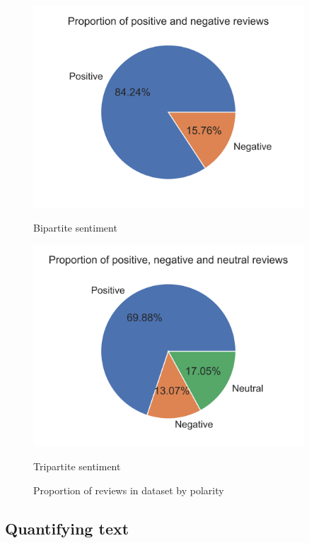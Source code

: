 \documentclass[11pt, a4paper]{pancake-article}
\begin{document}
\begin{figure}[htpb]
  \centering
  \begin{minipage}{0.5\textwidth}
    \centering
    \includegraphics[width=0.9\textwidth]{../results/old/pie_bipartite.png}
    \caption*{Bipartite sentiment}
  \end{minipage}\hfill
  \begin{minipage}{0.5\textwidth}
    \centering
    \includegraphics[width=0.9\textwidth]{../results/old/pie_tripartite.png}
    \caption*{Tripartite sentiment}
  \end{minipage}
  \caption{Proportion of reviews in dataset by polarity}
  \label{fig:pies}
\end{figure}

\subsection{Quantifying text}
\end{document}
